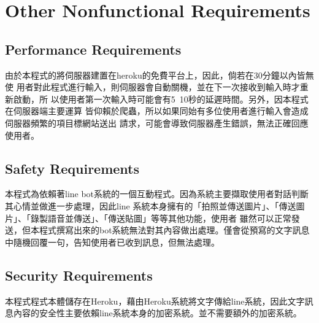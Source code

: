 \documentclass{scrreprt}
\begin{document}
\chapter{Other Nonfunctional Requirements}

\section{Performance Requirements}
\begin{CJK}{UTF8}{<font>}
由於本程式的將伺服器建置在heroku的免費平台上，因此，倘若在30分鐘以內皆無使
用者對此程式進行輸入，則伺服器會自動關機，並在下一次接收到輸入時才重新啟動，所
以使用者第一次輸入時可能會有5~10秒的延遲時間。另外，因本程式在伺服器端主要運算
皆仰賴於爬蟲，所以如果同始有多位使用者進行輸入會造成伺服器頻繁的項目標網站送出
請求，可能會導致伺服器產生錯誤，無法正確回應使用者。
\end{CJK}

\section{Safety Requirements}
\begin{CJK}{UTF8}{<font>}
本程式為依賴著line bot系統的一個互動程式。因為系統主要擷取使用者對話判斷其心情並做進一步處理，因此line
系統本身擁有的「拍照並傳送圖片」、「傳送圖片」、「錄製語音並傳送」、「傳送貼圖」等等其他功能，使用者
雖然可以正常發送，但本程式撰寫出來的bot系統無法對其內容做出處理。僅會從預寫的文字訊息中隨機回覆一句，告知使用者已收到訊息，但無法處理。
\end{CJK}

\section{Security Requirements}
\begin{CJK}{UTF8}{<font>}
本程式程式本體儲存在Heroku，藉由Heroku系統將文字傳給line系統，因此文字訊息內容的安全性主要依賴line系統本身的加密系統。並不需要額外的加密系統。
\end{CJK}
\end{document}
